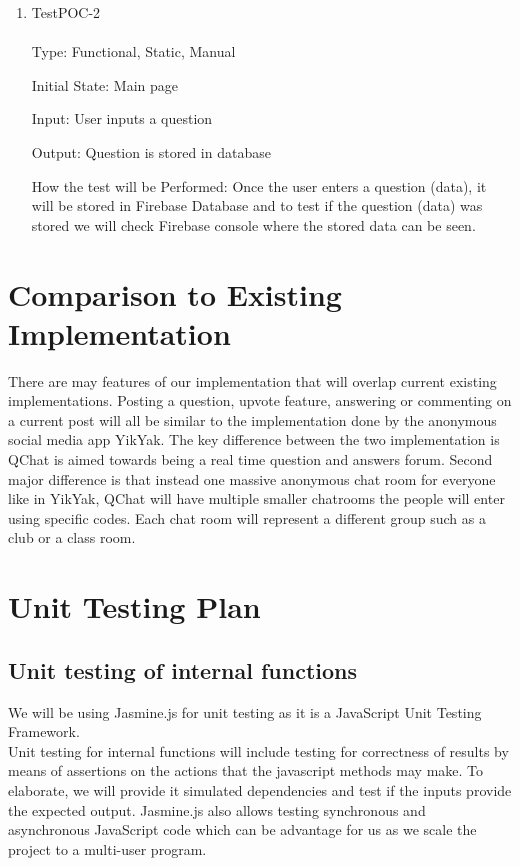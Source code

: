 \documentclass[12pt, titlepage]{article}
\begin{document}
\begin{enumerate}

\item{TestPOC-2\\\\}
Type: Functional, Static, Manual
	
Initial State: Main page

Input: User inputs a question

Output: Question is stored in database

How the test will be Performed: Once the user enters a question (data), it will be stored in Firebase Database and to test if the question (data) was stored we will check Firebase console where the stored data can be seen. 
\end{enumerate}
	
\section{Comparison to Existing Implementation}	
There are may features of our implementation that will overlap current existing implementations. Posting a question, upvote feature, answering or commenting on a current post will all be similar to the implementation done by the anonymous social media app YikYak. The key difference between the two implementation is QChat is aimed towards being a real time question and answers forum. Second major difference is that instead one massive anonymous chat room for everyone like in YikYak, QChat will have multiple smaller chatrooms the people will enter using specific codes. Each chat room will represent a different group such as a club or a class room.

\section{Unit Testing Plan}
		
\subsection{Unit testing of internal functions}
We will be using Jasmine.js for unit testing as it is a JavaScript Unit Testing Framework.\\

Unit testing for internal functions will include testing for correctness of results by means of assertions on the actions that the javascript methods may make. To elaborate, we will provide it  simulated dependencies and test if the inputs provide the expected output. Jasmine.js also allows testing synchronous and asynchronous JavaScript code which can be advantage for us as we scale the project to a multi-user program. \\
\end{document}
